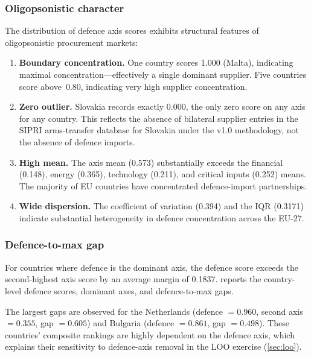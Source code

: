 \subsubsection{Oligopsonistic character}

The distribution of defence axis scores exhibits structural
features of oligopsonistic procurement markets:

\begin{enumerate}[leftmargin=2em]
  \item\begin{sloppypar}\textbf{Boundary concentration.}
    One country scores 1.000 (Malta), indicating maximal
    concentration---effectively a single dominant supplier.
    Five countries score above~0.80, indicating very high supplier
    concentration.\end{sloppypar}

  \item \textbf{Zero outlier.}  Slovakia records exactly 0.000,
    the only zero score on any axis for any country.  This reflects
    the absence of bilateral supplier entries in the SIPRI
    arms-transfer database for Slovakia under the v1.0 methodology,
    not the absence of defence imports.

  \item \textbf{High mean.}  The axis mean (0.573) substantially
    exceeds the financial (0.148), energy (0.365), technology (0.211),
    and critical inputs (0.252) means.  The majority of EU countries
    have concentrated defence-import partnerships.

  \item \textbf{Wide dispersion.}  The coefficient of variation
    (0.394) and the IQR (\num{0.3171}) indicate substantial
    heterogeneity in defence concentration across the EU-27.
\end{enumerate}

\subsubsection{Defence-to-max gap}

For countries where defence is the dominant axis, the defence score
exceeds the second-highest axis score by an average margin of
\num{0.1837}.   reports the country-level
defence scores, dominant axes, and defence-to-max gaps.



The largest gaps are observed for the Netherlands (defence $= 0.960$,
second axis $= 0.355$, gap $= 0.605$) and Bulgaria (defence $=
0.861$, gap $= 0.498$).  These countries' composite rankings are
highly dependent on the defence axis, which explains their sensitivity
to defence-axis removal in the LOO exercise (\cref{sec:loo}).

